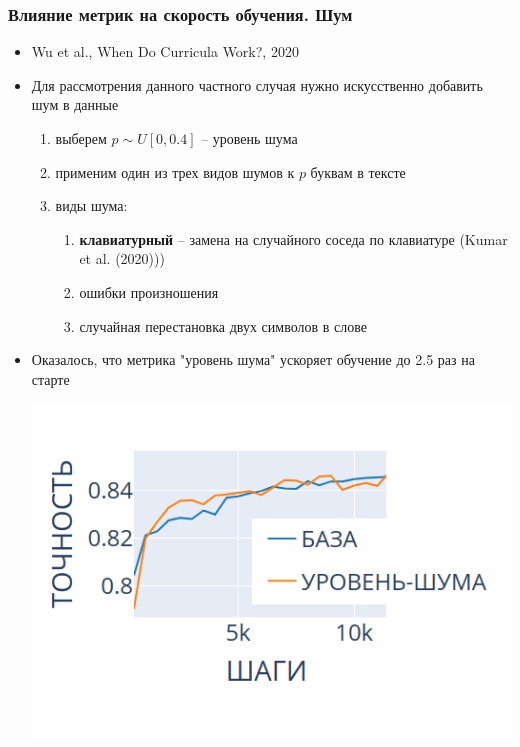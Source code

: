 \documentclass{beamer}
\begin{document}
\begin{frame}
	\frametitle{Влияние метрик на скорость обучения. Шум}
	\begin{itemize}
		\item Wu et al., When Do Curricula Work?, 2020
		\item Для рассмотрения данного частного случая нужно искусственно добавить шум в данные
			\begin{enumerate}
				\item выберем $p \sim U[0, 0.4]$ -- уровень шума
				\item применим один из трех видов шумов к $p$ буквам в тексте
				\item виды шума:
					\begin{enumerate}
						\item {\bf клавиатурный} -- замена на случайного соседа по клавиатуре (Kumar et al. (2020)))
						\item ошибки произношения
						\item случайная перестановка двух символов в слове
					\end{enumerate}
			\end{enumerate}
		\item Оказалось, что метрика "уровень шума" ускоряет обучение до 2.5 раз на старте
		
		\centering
		\includegraphics[scale=0.38]{keyboard_noise_level_short_prefix}
	\end{itemize}
\end{frame}
\end{document}
